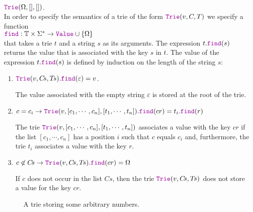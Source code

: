 \\[0.2cm]
\hspace*{1.3cm}
$\mytt{Trie}(\Omega, [], [])$.
\\[0.2cm]
In order to specify the semantics of a trie of the form $\mytt{Trie}(v,C,T)$ 
we specify a function
\\[0.2cm]
\hspace*{1.3cm} 
$\mytt{find}: \mathbb{T} \times \Sigma^* \rightarrow \mytt{Value} \cup \{ \Omega\}$
\\[0.2cm]
that takes a trie $t$ and a string $s$ as its arguments.  The expression $t.\mytt{find}(s)$ returns the
value that is associated with the key $s$ in $t$.  The value of the expression
$t.\mytt{find}(s)$ is defined by induction on the length of the  string $s$:
\begin{enumerate}
\item $\mytt{Trie}(v, C\!s, T\!s).\mytt{find}(\varepsilon) = v$.

      The value associated with the empty string $\varepsilon$ is stored at the root of the trie.
\item $c = c_i \rightarrow 
       \mytt{Trie}(v, [c_1, \cdots, c_n], [t_1, \cdots, t_n]).\mytt{find}(cr) = t_i.\mytt{find}(r)
      $

      The trie $\mytt{Trie}(v, [c_1, \cdots, c_n], [t_1, \cdots, t_n])$ associates a value with
      the key $cr$ if the list $[c_1, \cdots, c_n]$ has a position $i$ such that $c$ equals $c_i$
      and, furthermore, the trie  $t_i$ associates a value with the key  $r$.
\item $ c \not\in C\!s \rightarrow
       \mytt{Trie}(v, C\!s, T\!s).\mytt{find}(cr) = \Omega
      $

      If $c$ does not occur in the list $C\!s$, then the trie $\mytt{Trie}(v, C\!s, T\!s)$ does not store a value for
      the key $cr$.
\end{enumerate}

\begin{figure}[!ht]
  \centering
  \caption{A trie storing some arbitrary numbers.}
  \label{fig:trie}
\end{figure}

